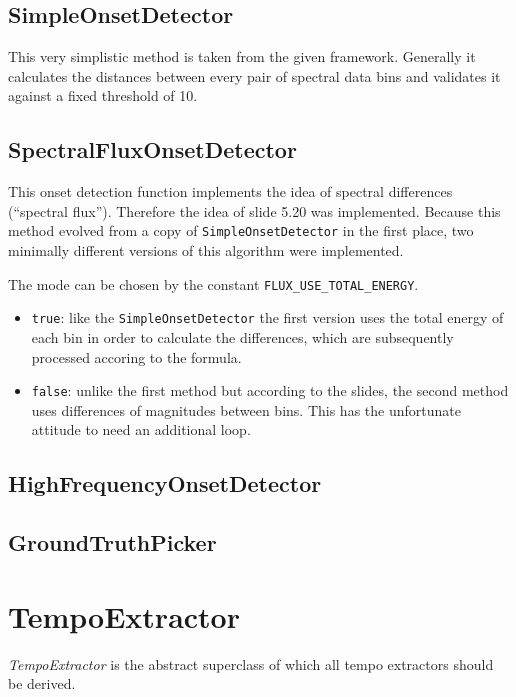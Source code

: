 \subsection{\ttfamily SimpleOnsetDetector}
This very simplistic method is taken from the given framework. Generally it
calculates the distances between every pair of spectral data bins and validates
it against a fixed threshold of 10.

\subsection{\ttfamily SpectralFluxOnsetDetector}
This onset detection function implements the idea of spectral differences
(``spectral flux''). Therefore the idea of slide 5.20 was implemented. Because
this method evolved from a copy of \texttt{SimpleOnsetDetector} in the first
place, two minimally different versions of this algorithm were implemented.

The mode can be chosen by the constant \texttt{FLUX\_USE\_TOTAL\_ENERGY}.

\begin{itemize}
  \item \texttt{true}: like the \texttt{SimpleOnsetDetector} the first version
  uses the total energy of each bin in order to calculate the differences, which
  are subsequently processed accoring to the formula.
  \item \texttt{false}: unlike the first method but according to the slides, the
  second method uses differences of magnitudes between bins. This has the
  unfortunate attitude to need an additional loop.
\end{itemize}

\subsection{\ttfamily HighFrequencyOnsetDetector}

\subsection{\ttfamily GroundTruthPicker}

\section{\ttfamily TempoExtractor}
\emph{TempoExtractor} is the abstract superclass of which all tempo extractors
should be derived.

